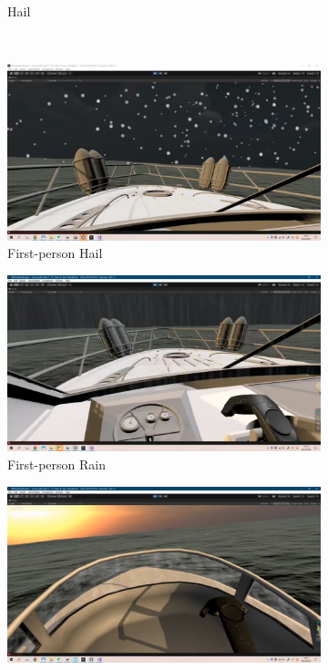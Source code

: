 \documentclass[a4paper,10pt]{article}
\begin{document}
\begin{figure}[htbp]
\begin{subfigure}{0.3\textwidth}
				\captionsetup{font=scriptsize}
				\caption{Hail}
				\label{fig: Third-person perspective another hail-IP}	
			\end{subfigure}\\
			\begin{subfigure}{0.3\textwidth}
				\includegraphics[width=\linewidth]{picture/First-person perspective Hail-IP}
				\captionsetup{font=scriptsize}
				\caption{First-person Hail}
				\label{fig: First-person perspective Hail-IP}	
			\end{subfigure}
			\begin{subfigure}{0.3\textwidth}
				\includegraphics[width=\linewidth]{picture/First-person perspective rain-IP}
				\captionsetup{font=scriptsize}
				\caption{First-person Rain}
				\label{fig: First-person perspective rain-IP}	
			\end{subfigure}
			\begin{subfigure}{0.3\textwidth}
				\includegraphics[width=\linewidth]{picture/First-person perspective-IP}

\end{subfigure}
\end{figure}
\end{document}
